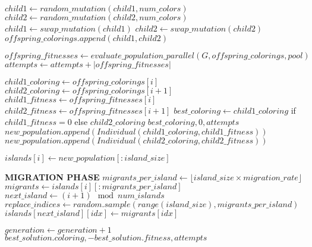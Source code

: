 \documentclass{article}
\begin{document}
\begin{algorithm}
\begin{algorithmic}[1]
                    \STATE $child1 \gets random\_mutation(child1, num\_colors)$
                    \STATE $child2 \gets random\_mutation(child2, num\_colors)$
                \ELSE
                    \STATE $child1 \gets swap\_mutation(child1)$
                    \STATE $child2 \gets swap\_mutation(child2)$
                \ENDIF
                \STATE $offspring\_colorings.append(child1, child2)$
            \ENDWHILE
    
            \STATE $offspring\_fitnesses \gets evaluate\_population\_parallel(G, offspring\_colorings, pool)$
            \STATE $attempts \gets attempts + |offspring\_fitnesses|$
    
                \STATE $child1\_coloring \gets offspring\_colorings[i]$
                \STATE $child2\_coloring \gets offspring\_colorings[i + 1]$
                \STATE $child1\_fitness \gets offspring\_fitnesses[i]$
                \STATE $child2\_fitness \gets offspring\_fitnesses[i + 1]$
                    \STATE $best\_coloring \gets child1\_coloring$ if $child1\_fitness = 0$ else $child2\_coloring$
                    \STATE \RETURN $best\_coloring, 0, attempts$
                \ENDIF
                \STATE $new\_population.append(Individual(child1\_coloring, child1\_fitness))$
                \STATE $new\_population.append(Individual(child2\_coloring, child2\_fitness))$
            \ENDFOR
    
            \STATE $islands[i] \gets new\_population[:island\_size]$
        \ENDFOR
    
        \STATE \textbf{MIGRATION PHASE}
            \STATE $migrants\_per\_island \gets \lfloor island\_size \times migration\_rate \rfloor$
                \STATE $migrants \gets islands[i][:migrants\_per\_island]$
                \STATE $next\_island \gets (i + 1) \mod num\_islands$
                \STATE $replace\_indices \gets random.sample(range(island\_size), migrants\_per\_island)$
                    \STATE $islands[next\_island][idx] \gets migrants[idx]$
                \ENDFOR
            \ENDFOR
        \ENDIF
    
        \STATE $generation \gets generation + 1$
    \ENDWHILE
    \STATE \RETURN $best\_solution.coloring, -best\_solution.fitness, attempts$
    \end{algorithmic}
    \end{algorithm}
\end{document}
